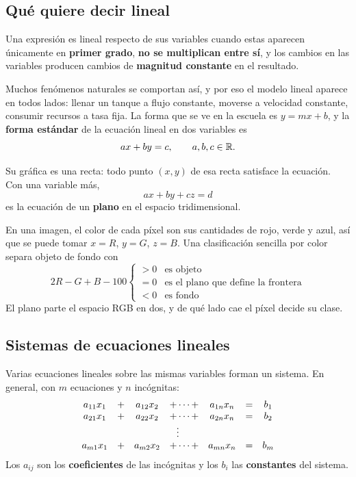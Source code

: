 \documentclass[11pt,letterpaper]{article}
\begin{document}
\subsection*{Qué quiere decir lineal}

\begin{definicion}
  Una expresión es lineal respecto de sus variables cuando estas
  aparecen únicamente en \textbf{primer grado}, \textbf{no se
  multiplican entre sí}, y los cambios en las variables producen
  cambios de \textbf{magnitud constante} en el resultado.
\end{definicion}

Muchos fenómenos naturales se comportan así, y por eso el modelo
lineal aparece en todos lados: llenar un tanque a flujo constante,
moverse a velocidad constante, consumir recursos a tasa fija. La forma
que se ve en la escuela es $y = mx + b$, y la \textbf{forma estándar}
de la ecuación lineal en dos variables es
\[
    ax + by = c , \qquad a, b, c \in \mathbb{R} .
\]

Su gráfica es una recta: todo punto $(x, y)$ de esa recta satisface la
ecuación. Con una variable más,
\[
    ax + by + cz = d
\]
es la ecuación de un \textbf{plano} en el espacio tridimensional.

\begin{ejemplo}
  En una imagen, el color de cada píxel son sus cantidades de rojo,
  verde y azul, así que se puede tomar $x = R$, $y = G$, $z = B$. Una
  clasificación sencilla por color separa objeto de fondo con
  \[
      2R - G + B - 100
      \begin{cases}
        > 0 & \text{es objeto} \\
        = 0 & \text{es el plano que define la frontera} \\
        < 0 & \text{es fondo}
      \end{cases}
  \]
  El plano parte el espacio RGB en dos, y de qué lado cae el píxel
  decide su clase.
\end{ejemplo}


\subsection*{Sistemas de ecuaciones lineales}

Varias ecuaciones lineales sobre las mismas variables forman un
sistema. En general, con $m$ ecuaciones y $n$ incógnitas:
\[
    \begin{array}{ccccccc}
      a_{11}x_1 & + & a_{12}x_2 & + \cdots + & a_{1n}x_n & = & b_1 \\
      a_{21}x_1 & + & a_{22}x_2 & + \cdots + & a_{2n}x_n & = & b_2 \\
      \multicolumn{7}{c}{\vdots} \\
      a_{m1}x_1 & + & a_{m2}x_2 & + \cdots + & a_{mn}x_n & = & b_m
    \end{array}
\]
Los $a_{ij}$ son los \textbf{coeficientes} de las incógnitas y los
$b_i$ las \textbf{constantes} del sistema.
\end{document}

